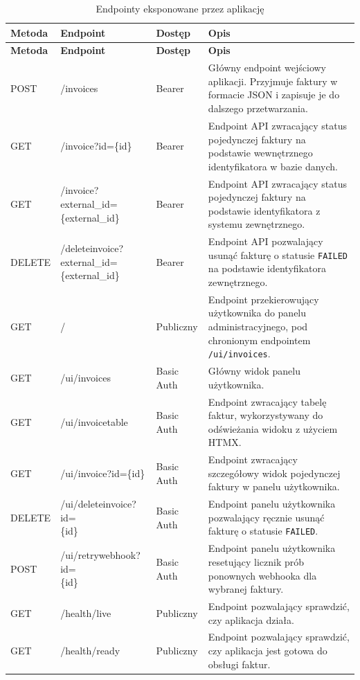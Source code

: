 \begin{small}
\begin{longtable}{>{\raggedright\arraybackslash}p{1.7cm} >{\raggedright\arraybackslash}p{4.3cm} >{\raggedright\arraybackslash}p{2.0cm} >{\raggedright\arraybackslash}p{4.6cm}}
\caption{Endpointy eksponowane przez aplikację}
\label{tab:app_endpoints} \\
\toprule
\textbf{Metoda} & \textbf{Endpoint} & \textbf{Dostęp} & \textbf{Opis} \\
\midrule
\endfirsthead

\toprule
\textbf{Metoda} & \textbf{Endpoint} & \textbf{Dostęp} & \textbf{Opis} \\
\midrule
\endhead

\bottomrule
\endfoot

POST & /invoices & Bearer & Główny endpoint wejściowy aplikacji. Przyjmuje faktury w formacie JSON i zapisuje je do dalszego przetwarzania. \\
GET & /invoice?id=\{id\} & Bearer & Endpoint API zwracający status pojedynczej faktury na podstawie wewnętrznego identyfikatora w bazie danych. \\
GET & \makecell[l]{/invoice?external\_id=\\\{external\_id\}} & Bearer & Endpoint API zwracający status pojedynczej faktury na podstawie identyfikatora z systemu zewnętrznego. \\
DELETE & \makecell[l]{/deleteinvoice?external\_id=\\\{external\_id\}} & Bearer & Endpoint API pozwalający usunąć fakturę o statusie \texttt{FAILED} na podstawie identyfikatora zewnętrznego. \\
GET & / & Publiczny & Endpoint przekierowujący użytkownika do panelu administracyjnego, pod chronionym endpointem \texttt{/ui/invoices}. \\
GET & /ui/invoices & Basic Auth & Główny widok panelu użytkownika. \\
GET & /ui/invoicetable & Basic Auth & Endpoint zwracający tabelę faktur, wykorzystywany do odświeżania widoku z użyciem HTMX. \\
GET & /ui/invoice?id=\{id\} & Basic Auth & Endpoint zwracający szczegółowy widok pojedynczej faktury w panelu użytkownika. \\
DELETE & \makecell[l]{/ui/deleteinvoice?id=\\\{id\}} & Basic Auth & Endpoint panelu użytkownika pozwalający ręcznie usunąć fakturę o statusie \texttt{FAILED}. \\
POST & \makecell[l]{/ui/retrywebhook?id=\\\{id\}} & Basic Auth & Endpoint panelu użytkownika resetujący licznik prób ponownych webhooka dla wybranej faktury. \\
GET & /health/live & Publiczny & Endpoint pozwalający sprawdzić, czy aplikacja działa. \\
GET & /health/ready & Publiczny & Endpoint pozwalający sprawdzić, czy aplikacja jest gotowa do obsługi faktur. \\
\end{longtable}
\end{small}

